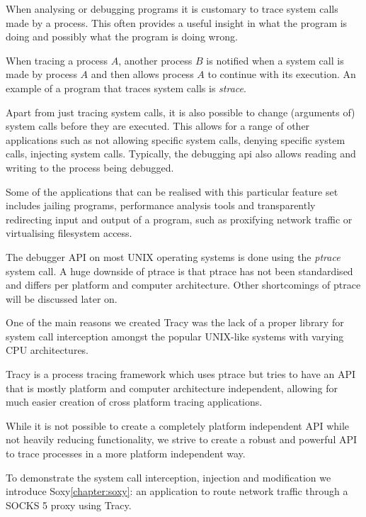 \documentclass[a4paper, twoside, 10pt, twocolumn]{report}
\begin{document}
When analysing or debugging programs it is customary to trace system calls made
by a process. This often provides a useful insight in what the program is doing
and possibly what the program is doing wrong.

When tracing a process $A$, another process $B$ is notified when a system call
is made by process $A$  and then allows process $A$ to continue with its
execution. An example of a program that traces system calls is
\textit{strace}\cite{strace}.

Apart from just tracing system calls, it is also possible to change
(arguments of) system calls before they are executed. This allows for a range
of other applications such as not allowing specific system calls, denying
specific system calls, injecting system calls. Typically, the debugging api also
allows reading and writing to the process being debugged.

Some of the applications that can be realised with this particular feature set
includes jailing programs, performance analysis tools and transparently
redirecting input and output of a program, such as proxifying network
traffic or virtualising filesystem access.

The debugger API on most UNIX operating systems is done using the
\textit{ptrace} system call. A huge downside of ptrace is that ptrace
has not been standardised and differs per platform and computer architecture. Other
shortcomings of ptrace will be discussed later on.

One of the main reasons we created Tracy was the lack of a proper library
for system call interception amongst the popular UNIX-like systems with
varying CPU architectures.

Tracy is a process tracing framework which uses ptrace but tries to have an API
that is mostly platform and computer architecture independent, allowing for much
easier creation of cross platform tracing applications.

While it is not possible to create a completely platform independent API while
not heavily reducing functionality, we strive to create a robust and powerful
API to trace processes in a more platform independent way.

To demonstrate the system call interception, injection and modification
we introduce Soxy\ref{chapter:soxy}: an application to route network
traffic through a SOCKS 5 proxy using Tracy.

%
\end{document}
